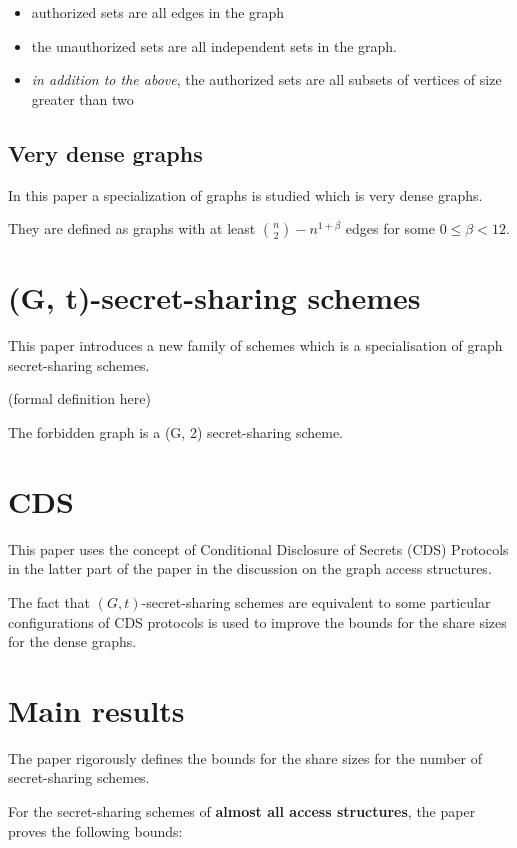 \begin{itemize}
    \item authorized sets are all edges in the graph
    \item the unauthorized sets are all independent sets in the graph.
    \item \textit{in addition to the above}, the authorized sets are all subsets of vertices of size greater than two
\end{itemize}

\subsection{Very dense graphs}

In this paper a specialization of graphs is studied which is very dense graphs.

They are defined as graphs with at least $\binom{n}{2} - n^{1 + \beta }$ edges for some $0 \le \beta < 12$.

\section{(G, t)-secret-sharing schemes}

This paper introduces a new family of schemes which is a specialisation of graph secret-sharing schemes.

(formal definition here)

The forbidden graph is a (G, 2) secret-sharing scheme.

\section{CDS}

This paper uses the concept of Conditional Disclosure of Secrets (CDS) Protocols in the latter part of the paper in the discussion on the graph access structures.

The fact that $(G,t)$-secret-sharing schemes are equivalent to some particular configurations of CDS protocols is used to improve the bounds for the share sizes for the dense graphs.

\section{Main results}

The paper rigorously defines the bounds for the share sizes for the number of secret-sharing schemes.

For the secret-sharing schemes of \textbf{almost all access structures}, the paper proves the following bounds:

